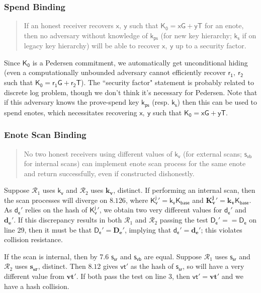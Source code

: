 \documentclass{article}
\theoremstyle{definition}
\newcommand{\6}{\mathbf}
\newcommand{\7}{\mathcal}
\renewcommand{\line}[1]{{\text{Section }$8.1$\text{, line }#1}}
\newcommand{\sect}[1]{{\text{Section }#1}}
\renewcommand{\sf}[1]{{\mathsf{#1}}}
\newcommand{\sfb}[1]{{\mathsf{\mathbf{#1}}}}
\begin{document}
\subsubsection{Spend Binding} 

\begin{quote}
        If an honest receiver recovers $\sf{x, \ y}$ such that $\sf{K_0 = xG + yT}$ for an enote, then no adversary without knowledge of $\sf{k_{ps}}$ (for new key hierarchy; $\sf{k_{s}}$ if on legacy key hierarchy) will be able to recover $\sf{x, \ y}$ up to a security factor. 
\end{quote}

Since $\sf{K_0}$ is a Pedersen commitment, we automatically get unconditional hiding (even a computationally unbounded adversary cannot efficiently recover $\sf{r_1, \ r_2}$ such that $\sf{K_0 = r_1 G + r_2 T}$). The ``security factor" statement is probably related to discrete log problem, though we don't think it's necessary for Pedersen.
Note that if this adversary knows the prove-spend key $\sf{k_{ps}}$ (resp. $\sf{k_{s}}$) then this can be used to spend enotes, which necessitates recovering $\sf{x, \ y}$ such that $\sf{K_0 = xG + yT}$.




\subsubsection{Enote Scan Binding} 

\begin{quote}
        No two honest receivers using different values of $\sf{k_v}$ (for external scans; $\sf{s_{vb}}$ for internal scans) can implement enote scan process for the same enote and return successfully, even if constructed dishonestly.  
\end{quote}

Suppose $\mathcal{R}_1$ uses $\sf{k_v}$ and $\mathcal{R}_2$ uses $\sfb{k_v}$, distinct. If performing an internal scan, then the scan processes will diverge on \line{26}, where $\sf{K_v^{j}}' = \sf{k_v} \sf{K_{base}}$ and $\sfb{K_v^{j}}' = \sfb{k_v} \sf{K_{base}}$. As $\sf{d_e'}$ relies on the hash of $\sf{K_v^{j}}'$, we obtain two very different values for $\sf{d_e'}$ and $\sfb{d_e'}$. If this discrepancy results in both $\mathcal{R}_1$ and $\mathcal{R}_2$ passing the test $\sf{D_e' == D_e}$ on line 29, then it must be that $\sf{D_e' = \6{D_e'}}$, implying that $\sf{d_e' = \6{d_e'}}$; this violates collision resistance.
\medskip 

If the scan is internal, then by \sect{7.6} $\sf{s_{sr}}$ and $\sf{s_{vb}}$ are equal. Suppose $\mathcal{R}_1$ uses $\sf{s_{sr}}$ and $\mathcal{R}_2$ uses $\sfb{s_{sr}}$, distinct. Then \line{2} gives $\sf{vt'}$ as the hash of $\sf{s_{sr}}$, so will have a very different value from $\sfb{vt'}$. If both pass the test on line 3, then $\sf{vt'} = \sfb{vt'}$ and we have a hash collision.
\end{document}
